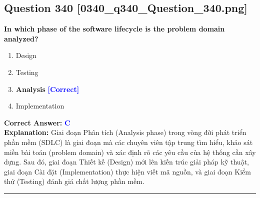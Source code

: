 \documentclass[11pt,a4paper]{article}
\begin{document}
\begin{minipage}{\textwidth}
\subsection*{Question 340 \quad \footnotesize{[0340\_q340\_Question\_340.png]}}
\noindent \textbf{In which phase of the software lifecycle is the problem domain analyzed?}

\begin{enumerate}[label=\Alph*.]
    \item Design
    \item Testing
    \item \textbf{Analysis} \hfill \textcolor{blue}{\textbf{[Correct]}}
    \item Implementation
\end{enumerate}

\noindent \textbf{Correct Answer:} \textcolor{blue}{\textbf{C}} \\[2pt]
\noindent \textbf{Explanation:} Giai đoạn Phân tích (Analysis phase) trong vòng đời phát triển phần mềm (SDLC) là giai đoạn mà các chuyên viên tập trung tìm hiểu, khảo sát miền bài toán (problem domain) và xác định rõ các yêu cầu của hệ thống cần xây dựng. Sau đó, giai đoạn Thiết kế (Design) mới lên kiến trúc giải pháp kỹ thuật, giai đoạn Cài đặt (Implementation) thực hiện viết mã nguồn, và giai đoạn Kiểm thử (Testing) đánh giá chất lượng phần mềm.

\par\vspace{0.3cm}
\hrule
\vspace{0.3cm}
\end{minipage}
\end{document}
